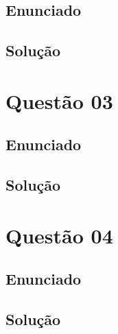 \documentclass[10pt, a4paper]{article}
\begin{document}
\subsection{Enunciado}

\lipsum[7-9]

\subsection{Solução}

\lipsum[10-12]

\section{Questão 03}\label{q03}

\subsection{Enunciado}

\lipsum[13-15]

\subsection{Solução}

\lipsum[16-18]

\section{Questão 04}

\subsection{Enunciado}

\lipsum[19-21]

\subsection{Solução}

\lipsum[22-24]




\end{document}
